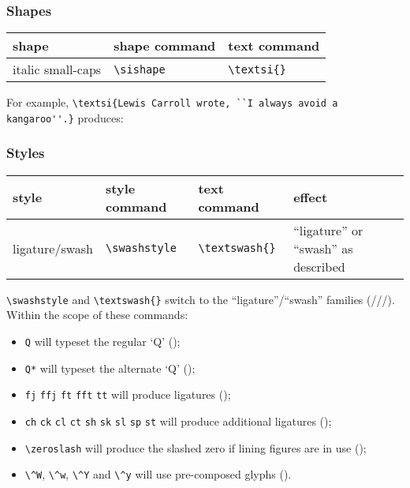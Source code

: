 \documentclass[11pt,british]{article}
\begin{document}
\subsubsection{Shapes}

	\begin{longtable}{lll}
		\toprule
		\textbf{shape}			&	\textbf{shape command}	&	\textbf{text command}\\\midrule\endhead
		\bottomrule\endfoot
		italic small-caps		&	\verb|\sishape|					&	\verb|\textsi{}|\\
	\end{longtable}
		
	For example, \verb|\textsi{Lewis Carroll wrote, ``I always avoid a kangaroo''.}| produces:
		\begin{center}
		\end{center}		
	
\subsubsection{Styles}

	\begin{longtable}{llll}
		\toprule
		\textbf{style}			&	\textbf{style command}	&	\textbf{text command}	&	\textbf{effect}\\\midrule\endhead
		\bottomrule\endfoot
		ligature/swash			&	\verb|\swashstyle|				&	\verb|\textswash{}|			&	``ligature'' or ``swash'' as described\\
	\end{longtable}
	
	\verb|\swashstyle| and \verb|\textswash{}| switch to the ``ligature''/``swash'' families (///). Within the scope of these commands:
	\begin{itemize}
		\item \verb|Q| will typeset the regular `Q' ();
		\item \verb|Q*| will typeset the alternate `Q' ();
		\item \verb|fj| \verb|ffj| \verb|ft| \verb|fft| \verb|tt| will produce ligatures ();
		\item \verb|ch| \verb|ck| \verb|cl| \verb|ct| \verb|sh| \verb|sk| \verb|sl| \verb|sp| \verb|st| will produce additional ligatures ();
		\item \verb|\zeroslash| will produce the slashed zero if lining figures are in use (\textswash{\textl{\zeroslash}/\texttl{\zeroslash}});
		\item \verb|\^W|, \verb|\^w|, \verb|\^Y| and \verb|\^y| will use pre-composed glyphs ().
	\end{itemize}
	
\end{document}
